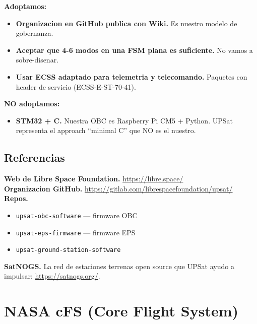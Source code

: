 \documentclass[11pt,a4paper,oneside,openright]{book}
\begin{document}
\begin{logrado}
\textbf{Adoptamos:}
\begin{itemize}[leftmargin=2em]
  \item \textbf{Organizacion en GitHub publica con Wiki.} Es nuestro
    modelo de gobernanza.
  \item \textbf{Aceptar que 4-6 modos en una FSM plana es suficiente.}
    No vamos a sobre-disenar.
  \item \textbf{Usar ECSS adaptado para telemetria y telecomando.}
    Paquetes con header de servicio (ECSS-E-ST-70-41).
\end{itemize}

\textbf{NO adoptamos:}
\begin{itemize}[leftmargin=2em]
  \item \textbf{STM32 + C.} Nuestra OBC es Raspberry Pi CM5 + Python.
    UPSat representa el approach ``minimal C'' que NO es el nuestro.
\end{itemize}
\end{logrado}

\section{Referencias}

\begin{payloadbox}
\textbf{Web de Libre Space Foundation.} \url{https://libre.space/}\\[0.3em]
\textbf{Organizacion GitHub.}
\url{https://gitlab.com/librespacefoundation/upsat/}\\[0.3em]
\textbf{Repos.}
\begin{itemize}[leftmargin=2em]
  \item \texttt{upsat-obc-software} --- firmware OBC
  \item \texttt{upsat-eps-firmware} --- firmware EPS
  \item \texttt{upsat-ground-station-software}
\end{itemize}
\textbf{SatNOGS.} La red de estaciones terrenas open source que UPSat
ayudo a impulsar: \url{https://satnogs.org/}.
\end{payloadbox}

\chapter{NASA cFS (Core Flight System)}
\end{document}

